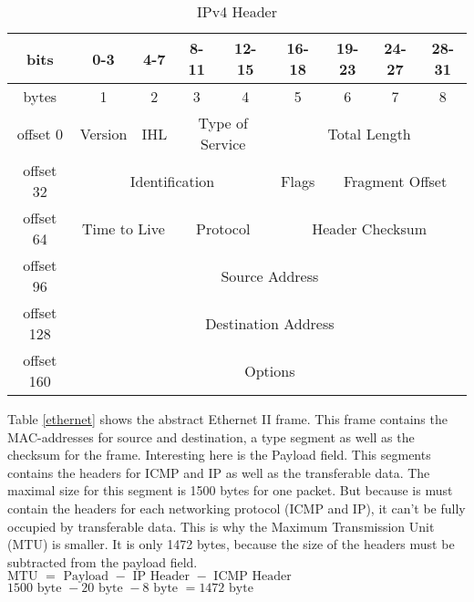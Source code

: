 \begin{table}[H]
	\centering
	\label{ipv4-header}
	\begin{tabular}{|c|c|c|c|c|c|c|c|c|}
		\hline
		bits       & 0-3               & 4-7           & 8-11             & 12-15             & 16-18  & 19-23      & 24-27      & 28-31      \\ \hline
		bytes      & 1                 & 2             & 3                & 4                 & 5      & 6          & 7          & 8          \\ \hline
		offset 0   & Version           & IHL           & \multicolumn{2}{c|}{Type of Service} & \multicolumn{4}{c|}{Total Length}             \\ \hline
		offset 32  & \multicolumn{4}{c|}{Identification}                                      & Flags  & \multicolumn{3}{c|}{Fragment Offset} \\ \hline
		offset 64  & \multicolumn{2}{c|}{Time to Live} & \multicolumn{2}{c|}{Protocol}        & \multicolumn{4}{c|}{Header Checksum}          \\ \hline
		offset 96  & \multicolumn{8}{c|}{Source Address}                                                                                      \\ \hline
		offset 128 & \multicolumn{8}{c|}{Destination Address}                                                                                 \\ \hline
		offset 160 & \multicolumn{8}{c|}{Options}                                                                                             \\ \hline
	\end{tabular}
	\caption{IPv4 Header}
\end{table}

Table \ref{ethernet} shows the abstract Ethernet II frame. This frame contains the MAC-addresses for source and destination, a type segment as well as the checksum for the frame. Interesting here is the Payload field. This segments contains the headers for ICMP and IP as well as the transferable data. The maximal size for this segment is 1500 bytes for one packet. But because is must contain the headers for each networking protocol (ICMP and IP), it can't be fully occupied by transferable data. This is why the Maximum Transmission Unit (MTU) is smaller. It is only 1472 bytes, because the size of the headers must be subtracted from the payload field.
$ \text{MTU } = \text{ Payload } - \text{ IP Header } - \text{ ICMP Header }$\\
$ 1500\text{ byte } - 20 \text{ byte } - 8 \text{ byte } = 1472 \text{ byte }$

